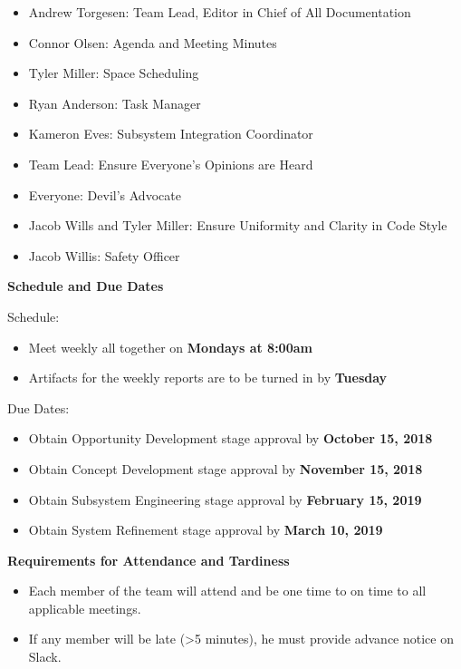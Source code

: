\begin{itemize}
\item Andrew Torgesen: Team Lead, Editor in Chief of All Documentation
\item Connor Olsen: Agenda and Meeting Minutes
\item Tyler Miller: Space Scheduling
\item Ryan Anderson: Task Manager
\item Kameron Eves: Subsystem Integration Coordinator
\item Team Lead: Ensure Everyone’s Opinions are Heard
\item Everyone: Devil’s Advocate
\item Jacob Wills and Tyler Miller: Ensure Uniformity and Clarity in Code Style
\item Jacob Willis: Safety Officer
\end{itemize}

\textbf{Schedule and Due Dates}

Schedule:

\begin{itemize}
\item Meet weekly all together on \textbf{Mondays at 8:00am}
\item Artifacts for the weekly reports are to be turned in by \textbf{Tuesday}
\end{itemize}

Due Dates:

\begin{itemize}
\item Obtain Opportunity Development stage approval by \textbf{October 15, 2018}
\item Obtain Concept Development stage approval by \textbf{November 15, 2018}
\item Obtain Subsystem Engineering stage approval by \textbf{February 15, 2019}
\item Obtain System Refinement stage approval by \textbf{March 10, 2019}
\end{itemize}

\textbf{Requirements for Attendance and Tardiness}

\begin{itemize}
\item Each member of the team will attend and be one time to on time to all applicable meetings.
\item If any member will be late (>5 minutes), he must provide advance notice on Slack.
\end{itemize}

